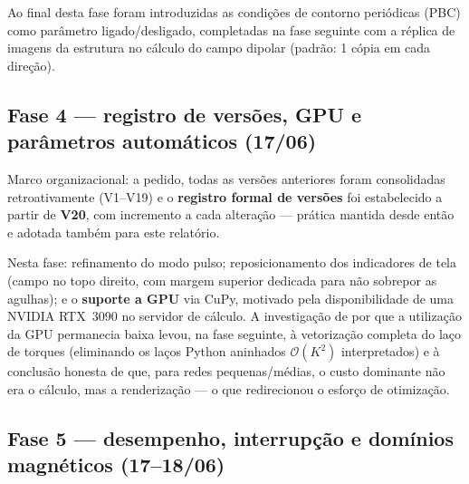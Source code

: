 \documentclass[11pt,a4paper]{article}
\begin{document}
Ao final desta fase foram introduzidas as condições de contorno
periódicas (PBC) como parâmetro ligado/desligado, completadas na fase
seguinte com a réplica de imagens da estrutura no cálculo do campo
dipolar (padrão: 1 cópia em cada direção).

\subsection{Fase 4 --- registro de versões, GPU e parâmetros
automáticos (17/06)}

Marco organizacional: a pedido, todas as versões anteriores foram
consolidadas retroativamente (V1--V19) e o \textbf{registro formal de
versões} foi estabelecido a partir de \textbf{V20}, com incremento a
cada alteração --- prática mantida desde então e adotada também para
este relatório.

Nesta fase: refinamento do modo pulso; reposicionamento dos indicadores
de tela (campo no topo direito, com margem superior dedicada para não
sobrepor as agulhas); e o \textbf{suporte a GPU} via CuPy, motivado pela
disponibilidade de uma NVIDIA RTX~3090 no servidor de cálculo. A
investigação de por que a utilização da GPU permanecia baixa levou, na
fase seguinte, à vetorização completa do laço de torques (eliminando os
laços Python aninhados $\mathcal{O}(K^2)$ interpretados) e à conclusão
honesta de que, para redes pequenas/médias, o custo dominante não era o
cálculo, mas a renderização --- o que redirecionou o esforço de
otimização.

\subsection{Fase 5 --- desempenho, interrupção e domínios magnéticos
(17--18/06)}
\end{document}
